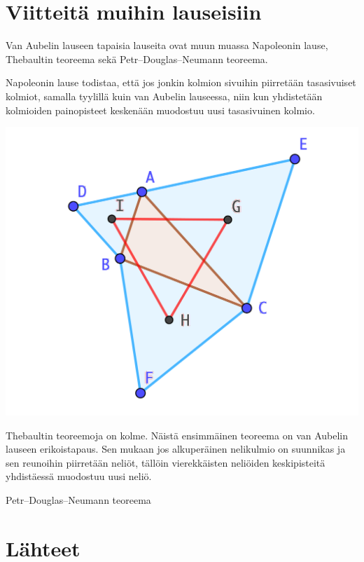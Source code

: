 \documentclass{scrartcl}
\begin{document}
\pagebreak
\section{Viitteitä muihin lauseisiin}

Van Aubelin lauseen tapaisia lauseita ovat muun muassa Napoleonin lause, Thebaultin teoreema sekä Petr–Douglas–Neumann teoreema.

Napoleonin lause todistaa, että jos jonkin kolmion sivuihin piirretään tasasivuiset kolmiot, samalla tyylillä kuin van Aubelin lauseessa, niin kun yhdistetään kolmioiden painopisteet keskenään muodostuu uusi tasasivuinen kolmio.
\begin{center}
    \includegraphics[scale=0.6]{Napoleonin.png}
\end{center}

Thebaultin teoreemoja on kolme. Näistä ensimmäinen teoreema on van Aubelin lauseen erikoistapaus. Sen mukaan jos alkuperäinen nelikulmio on suunnikas ja sen reunoihin piirretään neliöt, tällöin vierekkäisten neliöiden keskipisteitä yhdistäessä muodostuu uusi neliö.

Petr–Douglas–Neumann teoreema 


\pagebreak
\section{Lähteet}


\end{document}

